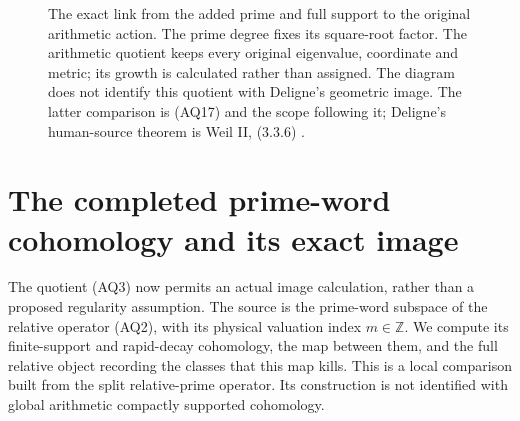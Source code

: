 \documentclass[11pt,a4paper]{article}
\theoremstyle{definition}\newtheorem{definition}[theorem]{Definition}
\begin{document}
\begin{figure}[ht]
\centering
{}
\caption{The exact link from the added prime and full support to the
original arithmetic action. The prime degree fixes its square-root
factor. The arithmetic quotient keeps every original eigenvalue,
coordinate and metric; its growth is calculated rather than assigned.
The diagram does not identify this quotient with Deligne's geometric
image. The latter comparison is (AQ17) and the scope following it;
Deligne's human-source theorem is Weil II, (3.3.6) \cite{DeligneII}.}
\end{figure}

\section{The completed prime-word cohomology and its exact image}
\label{sec:completed-prime-word}
The quotient (AQ3) now permits an actual image calculation, rather
than a proposed regularity assumption. The source is the prime-word
subspace of the relative operator (AQ2), with its physical valuation
index $m\in\mathbb Z$. We compute its finite-support and rapid-decay
cohomology, the map between them, and the full relative object
recording the classes that this map kills. This is a local comparison
built from the split relative-prime operator. Its construction is not
identified with global arithmetic compactly supported cohomology.
\end{document}
